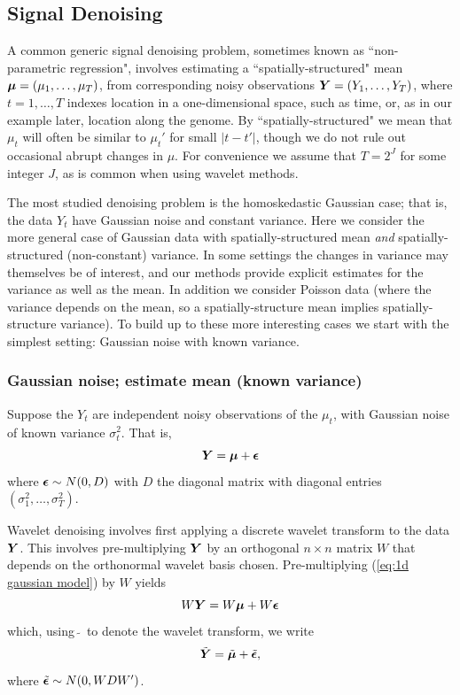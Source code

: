 \documentclass[12pt]{article}
\newcommand{\s}{\sigma}
\begin{document}
\subsection{Signal Denoising}

A common generic signal denoising problem, sometimes known as ``non-parametric regression", involves
estimating a ``spatially-structured" mean $\bm{\mu}=(\mu_1,\dots,\mu_T)$, from corresponding
noisy observations $\bm{Y} = (Y_1,\dots,Y_T)$, where $t=1,\dots,T$ indexes location in a one-dimensional space,
such as time, or, as in our example later, location along the genome. 
 By ``spatially-structured" we mean that $\mu_t$ will often be similar to $\mu_t'$ for small $|t-t'|$, though we do not rule
out occasional abrupt changes in $\mu$.  For convenience we assume that $T=2^J$ for some integer $J$, as is common when using wavelet methods.

The most studied denoising problem is the homoskedastic Gaussian case; that is, 
the data $Y_t$ have Gaussian noise and constant variance.
Here we consider the more general case of Gaussian data with
spatially-structured mean {\it and} spatially-structured (non-constant) variance. 
In some settings the changes in variance may themselves be of interest, and our methods provide explicit estimates for the variance as well as the mean. In addition we consider Poisson data (where the variance depends on the mean, so 
a spatially-structure mean implies spatially-structure variance).
To build up to these more interesting cases we start with the simplest setting: 
Gaussian noise with known variance.

\subsubsection{Gaussian noise; estimate mean (known variance)}

Suppose the $Y_t$ are independent noisy observations of the $\mu_t$, with Gaussian noise of known variance $\s^2_t$. That is,
\begin{equation}\label{eq:1d gaussian model}
\bm{Y} =\bm{\mu}+\bm{\epsilon}
\end{equation}
where $\bm{\epsilon} \sim N(0,D)$ with $D$ the diagonal matrix with diagonal entries $(\s_1^2,\dots,\s_T^2)$.

Wavelet denoising involves first applying a discrete wavelet transform to the data $\bm{Y}$. This
involves pre-multiplying $\bm{Y}$ by an orthogonal $n\times n$ matrix $W$ that depends on the orthonormal wavelet basis chosen. Pre-multiplying (\ref{eq:1d gaussian model}) by $W$ yields
\begin{equation} 
W\bm{Y}=W\bm{\mu} + W\bm{\epsilon} 
\end{equation}
which, using $\,\tilde{}\,$ to denote the wavelet transform, we write
\begin{equation} \label{eq:wc}
\tilde{\bm{Y}}=\tilde{\bm{\mu}} + \tilde{\bm{\epsilon}},
\end{equation}
where $\tilde{\bm{\epsilon}} \sim N(0,W D W')$. 
\end{document}
